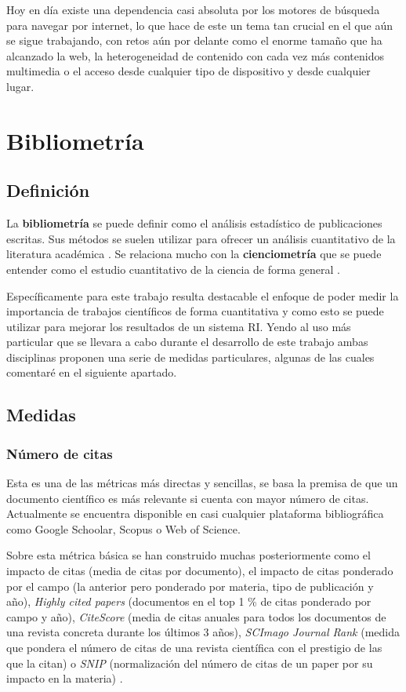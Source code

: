 Hoy en día existe una dependencia casi absoluta por los motores de búsqueda para navegar por internet, lo que hace de este un tema tan crucial en el que aún se sigue trabajando, con retos aún por delante como el enorme tamaño que ha alcanzado la web, la heterogeneidad de contenido con cada vez más contenidos multimedia o el acceso desde cualquier tipo de dispositivo y desde cualquier lugar. 

\section{Bibliometría}
\label{sc:bibliometria}
\subsection{Definición}
La \textbf{bibliometría} se puede definir como el análisis estadístico de publicaciones escritas. Sus métodos se suelen utilizar para ofrecer un análisis cuantitativo de la literatura académica \cite{de2009bibliometrics}. Se relaciona mucho con la \textbf{cienciometría} que se puede entender como el estudio cuantitativo de la ciencia de forma general \cite{DBLP:journals/corr/abs-1208-4566}. 

Específicamente para este trabajo resulta destacable el enfoque de poder medir la importancia de trabajos científicos de forma cuantitativa y como esto se puede utilizar para mejorar los resultados de un sistema \acrshort{RI}. Yendo al uso más particular que se llevara a cabo durante el desarrollo de este trabajo ambas disciplinas proponen una serie de medidas particulares, algunas de las cuales comentaré en el siguiente apartado.

\subsection{Medidas}
\subsubsection{Número de citas} \label{numero_citas}
Esta es una de las métricas más directas y sencillas, se basa la premisa de que un documento científico es más relevante si cuenta con mayor número de citas. Actualmente se encuentra disponible en casi cualquier plataforma bibliográfica como Google Schoolar, Scopus o Web of Science. 

Sobre esta métrica básica se han construido muchas posteriormente como el impacto de citas (media de citas por documento), el impacto de citas ponderado por el campo (la anterior pero ponderado por materia, tipo de publicación y año), \textit{Highly cited papers} (documentos en el top 1 \% de citas ponderado por campo y año)\cite{BibliometricWhitePaper}, \textit{CiteScore} (media de citas anuales para todos los documentos de una revista concreta durante los últimos 3 años), \textit{SCImago Journal Rank} (medida que pondera el número de citas de una revista científica con el prestigio de las que la citan) o \textit{SNIP} (normalización del número de citas de un paper por su impacto en la materia) \cite{bibliometric_measures}.
